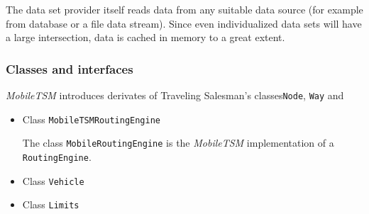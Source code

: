 The data set provider itself reads data from any suitable data source (for example from database or a file data stream). Since even individualized data sets will have a large intersection, data is cached in memory to a great extent.

\subsubsection{Classes and interfaces}

\emph{MobileTSM} introduces derivates of Traveling Salesman's classes\texttt{Node}, \texttt{Way} and





\begin{itemize}
		
	\item Class \texttt{MobileTSMRoutingEngine}
	
		The class \texttt{MobileRoutingEngine} is the \emph{MobileTSM} implementation of a \texttt{RoutingEngine}.
		
	\item Class \texttt{Vehicle}
		
	\item Class \texttt{Limits}

\end{itemize}
